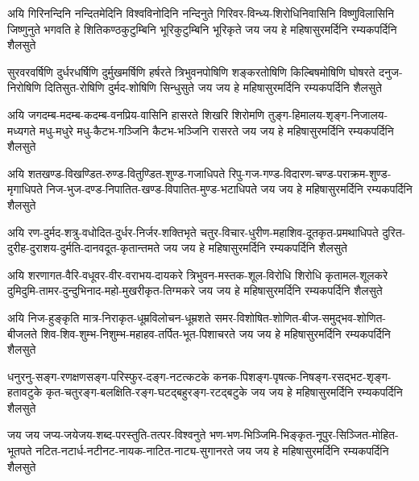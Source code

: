 

\fourlineindentedshloka
{अयि गिरिनन्दिनि नन्दितमेदिनि विश्वविनोदिनि नन्दिनुते}
{गिरिवर-विन्ध्य-शिरोधिनिवासिनि विष्णुविलासिनि जिष्णुनुते}
{भगवति हे शितिकण्ठकुटुम्बिनि भूरिकुटुम्बिनि भूरिकृते}
{जय जय हे महिषासुरमर्दिनि रम्यकपर्दिनि शैलसुते}

\fourlineindentedshloka
{सुरवरवर्षिणि दुर्धरधर्षिणि दुर्मुखमर्षिणि हर्षरते}
{त्रिभुवनपोषिणि शङ्करतोषिणि किल्बिषमोषिणि घोषरते}
{दनुज-निरोषिणि दितिसुत-रोषिणि दुर्मद-शोषिणि सिन्धुसुते}
{जय जय हे महिषासुरमर्दिनि रम्यकपर्दिनि शैलसुते}

\fourlineindentedshloka
{अयि जगदम्ब-मदम्ब-कदम्ब-वनप्रिय-वासिनि हासरते}
{शिखरि शिरोमणि तुङ्ग-हिमालय-शृङ्ग-निजालय-मध्यगते}
{मधु-मधुरे मधु-कैटभ-गञ्जिनि कैटभ-भञ्जिनि रासरते}
{जय जय हे महिषासुरमर्दिनि रम्यकपर्दिनि शैलसुते}

\fourlineindentedshloka
{अयि शतखण्ड-विखण्डित-रुण्ड-वितुण्डित-शुण्ड-गजाधिपते}
{रिपु-गज-गण्ड-विदारण-चण्ड-पराक्रम-शुण्ड-मृगाधिपते}
{निज-भुज-दण्ड-निपातित-खण्ड-विपातित-मुण्ड-भटाधिपते}
{जय जय हे महिषासुरमर्दिनि रम्यकपर्दिनि शैलसुते}

\fourlineindentedshloka
{अयि रण-दुर्मद-शत्रु-वधोदित-दुर्धर-निर्जर-शक्तिभृते}
{चतुर-विचार-धुरीण-महाशिव-दूतकृत-प्रमथाधिपते}
{दुरित-दुरीह-दुराशय-दुर्मति-दानवदूत-कृतान्तमते}
{जय जय हे महिषासुरमर्दिनि रम्यकपर्दिनि शैलसुते}

\fourlineindentedshloka
{अयि शरणागत-वैरि-वधूवर-वीर-वराभय-दायकरे}
{त्रिभुवन-मस्तक-शूल-विरोधि शिरोधि कृतामल-शूलकरे}
{दुमिदुमि-तामर-दुन्दुभिनाद-महो-मुखरीकृत-तिग्मकरे}
{जय जय हे महिषासुरमर्दिनि रम्यकपर्दिनि शैलसुते}

\fourlineindentedshloka
{अयि निज-हुङ्कृति मात्र-निराकृत-धूम्रविलोचन-धूम्रशते}
{समर-विशोषित-शोणित-बीज-समुद्भव-शोणित-बीजलते}
{शिव-शिव-शुम्भ-निशुम्भ-महाहव-तर्पित-भूत-पिशाचरते}
{जय जय हे महिषासुरमर्दिनि रम्यकपर्दिनि शैलसुते}

\fourlineindentedshloka
{धनुरनु-सङ्ग-रणक्षणसङ्ग-परिस्फुर-दङ्ग-नटत्कटके}
{कनक-पिशङ्ग-पृषत्क-निषङ्ग-रसद्भट-शृङ्ग-हतावटुके}
{कृत-चतुरङ्ग-बलक्षिति-रङ्ग-घटद्बहुरङ्ग-रटद्बटुके}
{जय जय हे महिषासुरमर्दिनि रम्यकपर्दिनि शैलसुते}

\fourlineindentedshloka
{जय जय जप्य-जयेजय-शब्द-परस्तुति-तत्पर-विश्वनुते}
{भण-भण-भिञ्जिमि-भिङ्कृत-नूपुर-सिञ्जित-मोहित-भूतपते}
{नटित-नटार्ध-नटीनट-नायक-नाटित-नाट्य-सुगानरते}
{जय जय हे महिषासुरमर्दिनि रम्यकपर्दिनि शैलसुते}

